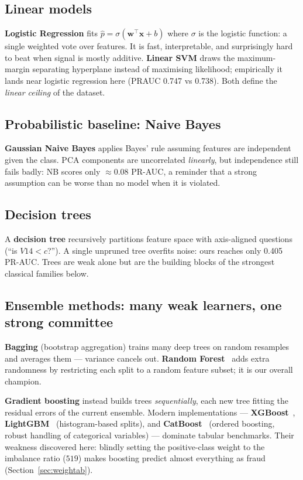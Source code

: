 \documentclass[11pt,a4paper]{article}
\newcommand{\term}[1]{\textbf{\textcolor{accent}{#1}}}
\begin{document}
\subsection{Linear models}
\term{Logistic Regression} fits
$\hat{p} = \sigma(\mathbf{w}^{\top}\mathbf{x} + b)$ where $\sigma$ is the logistic function:
a single weighted vote over features. It is fast, interpretable, and surprisingly hard to beat
when signal is mostly additive. \term{Linear SVM} draws the maximum-margin separating hyperplane
instead of maximising likelihood; empirically it lands near logistic regression here
(PRAUC 0.747 vs 0.738). Both define the \emph{linear ceiling} of the dataset.

\subsection{Probabilistic baseline: Naive Bayes}
\term{Gaussian Naive Bayes} applies Bayes' rule assuming features are independent given the
class. PCA components are uncorrelated \emph{linearly}, but independence still fails badly:
NB scores only $\approx 0.08$ PR-AUC, a reminder that a strong assumption can be worse than no
model when it is violated.

\subsection{Decision trees}
A \term{decision tree} recursively partitions feature space with axis-aligned questions
(``is $V14 < c$?''). A single unpruned tree overfits noise: ours reaches only 0.405 PR-AUC.
Trees are weak alone but are the building blocks of the strongest classical families below.

\subsection{Ensemble methods: many weak learners, one strong committee}
\term{Bagging} (bootstrap aggregation) trains many deep trees on random resamples and averages
them --- variance cancels out. \textbf{Random Forest}~\cite{breiman2001} adds extra randomness
by restricting each split to a random feature subset; it is our overall champion.

\term{Gradient boosting} instead builds trees \emph{sequentially}, each new tree fitting the
residual errors of the current ensemble. Modern implementations --- \textbf{XGBoost}~\cite{chen2016},
\textbf{LightGBM}~\cite{ke2017} (histogram-based splits), and \textbf{CatBoost}~\cite{prokhorenkova2018}
(ordered boosting, robust handling of categorical variables) --- dominate tabular benchmarks.
Their weakness discovered here: blindly setting the positive-class weight to the imbalance ratio
($519$) makes boosting predict almost everything as fraud (Section~\ref{sec:weightab}).
\end{document}
